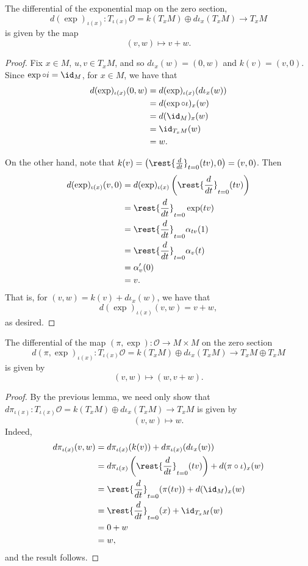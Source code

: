 \begin{lem}
    The differential of the exponential map on the zero section,
    $$d(\exp)_{\iota(x)}:T_{\iota(x)}\mathcal{O}=k(T_xM)\oplus d\iota_x(T_xM)\to T_xM$$ is given by the map
    $$(v,w)\mapsto v+w.$$
\end{lem}

\begin{proof}
Fix $x\in M$, $u,v\in T_xM$, and so $d\iota_x(w)=(0,w)$ and $k(v)=(v,0)$.  Since $\exp\circ i=\id_M$, for $x\in M$, we have that
\begin{align*}
	d(\exp)_{\iota(x)}(0,w)&=d(\exp)_{\iota(x)}(d\iota_x(w))\\
	&=d(\exp\circ\iota)_x(w)\\
	&=d(\id_M)_x(w)\\
	&=\id_{T_xM}(w)\\
	&=w.
\end{align*}

On the other hand, note that $k(v)=\left(\rest{\frac{d}{dt}}_{t=0}(tv),0\right)=(v,0)$.  Then
\begin{align*}
	d(\exp)_{\iota(x)}(v,0)&=d(\exp)_{\iota(x)}\left(\rest{\frac{d}{dt}}_{t=0}(tv)\right)\\
	&=\rest{\frac{d}{dt}}_{t=0}\exp(tv)\\
	&=\rest{\frac{d}{dt}}_{t=0}\alpha_{tv}(1)\\
	&=\rest{\frac{d}{dt}}_{t=0}\alpha_v(t)\\
	&=\alpha_v'(0)\\
	&=v.
\end{align*}
That is, for $(v,w)=k(v)+d\iota_x(w)$, we have that
$$d(\exp)_{\iota(x)}(v,w)=v+w,$$
as desired.
\end{proof}

\begin{lem}
    The differential of the map $(\pi,\exp):\mathcal{O}\to M\times M$ on the zero section 
    $$d(\pi,\exp)_{\iota(x)}:T_{\iota(x)}\mathcal{O}=k(T_xM)\oplus d\iota_x(T_xM)\to T_xM\oplus T_xM$$
    is given by
    $$(v,w)\mapsto(w,v+w).$$
\end{lem}

\begin{proof}
By the previous lemma, we need only show that $d\pi_{\iota(x)}:T_{\iota(x)}\mathcal{O}=k(T_xM)\oplus d\iota_x(T_xM)\to T_xM$ is given by
$$(v,w)\mapsto w.$$
Indeed,
\begin{align*}
	d\pi_{\iota(x)}(v,w)&=d\pi_{\iota(x)}(k(v))+d\pi_{\iota(x)}(d\iota_x(w))\\
	&=d\pi_{\iota(x)}\left(\rest{\frac{d}{dt}}_{t=0}(tv)\right)+d(\pi\circ\iota)_x(w)\\
	&=\rest{\frac{d}{dt}}_{t=0}(\pi(tv))+d(\id_M)_x(w)\\
	&=\rest{\frac{d}{dt}}_{t=0}(x)+\id_{T_xM}(w)\\
	&=0+w\\
	&=w,
\end{align*}
and the result follows.
\end{proof}

